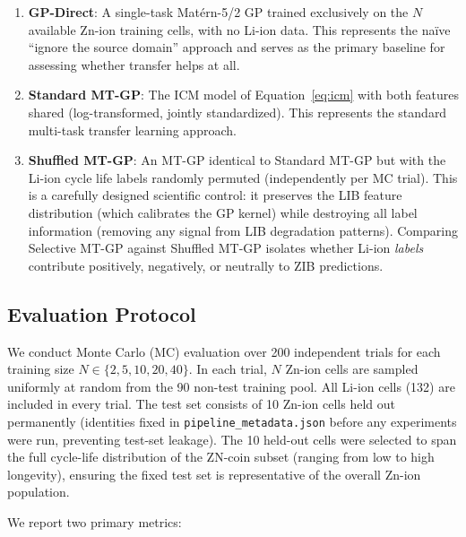 \documentclass[12pt]{article}
\begin{document}
\begin{enumerate}
  \item \textbf{GP-Direct}: A single-task Mat\'ern-5/2 GP trained exclusively
  on the $N$ available Zn-ion training cells, with no Li-ion data. This
  represents the na\"ive ``ignore the source domain'' approach and serves as
  the primary baseline for assessing whether transfer helps at all.

  \item \textbf{Standard MT-GP}: The ICM model of Equation~\eqref{eq:icm}
  with both features shared (log-transformed, jointly standardized). This
  represents the standard multi-task transfer learning approach.

  \item \textbf{Shuffled MT-GP}: An MT-GP identical to Standard MT-GP but with
  the Li-ion cycle life labels randomly permuted (independently per MC trial).
  This is a carefully designed scientific control: it preserves the LIB feature
  distribution (which calibrates the GP kernel) while destroying all label
  information (removing any signal from LIB degradation patterns). Comparing
  Selective MT-GP against Shuffled MT-GP isolates whether Li-ion \emph{labels}
  contribute positively, negatively, or neutrally to ZIB predictions.
\end{enumerate}

\subsection{Evaluation Protocol}

We conduct Monte Carlo (MC) evaluation over 200 independent trials for each
training size $N \in \{2, 5, 10, 20, 40\}$. In each trial, $N$ Zn-ion cells
are sampled uniformly at random from the 90 non-test training pool. All Li-ion
cells (132) are included in every trial. The test set consists of 10 Zn-ion
cells held out permanently (identities fixed in \texttt{pipeline\_metadata.json}
before any experiments were run, preventing test-set leakage). The 10 held-out
cells were selected to span the full cycle-life distribution of the ZN-coin
subset (ranging from low to high longevity), ensuring the fixed test set is
representative of the overall Zn-ion population.

We report two primary metrics:
\end{document}
